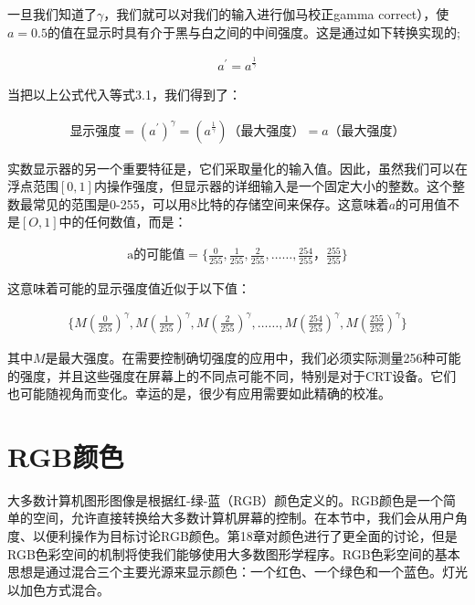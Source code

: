 \documentclass[lang=cn,12pt]{elegantbook}
\begin{document}
一旦我们知道了$\gamma$，我们就可以对我们的输入进行伽马校正gamma correct），使$a=0.5$的值在显示时具有介于黑与白之间的中间强度。这是通过如下转换实现的;

\[
  \begin{aligned}
  a^{'} = a^{\frac{1}{\gamma } }
  \end{aligned}
\]

当把以上公式代入等式3.1，我们得到了：

\[
  \begin{aligned}
  \mbox{显示强度} = (a^{'})^\gamma = (a^{\frac{1}{\gamma}})\mbox{（最大强度）} = a\mbox{（最大强度）}
  \end{aligned}
\]


实数显示器的另一个重要特征是，它们采取量化的输入值。因此，虽然我们可以在浮点范围$[0,1]$内操作强度，但显示器的详细输入是一个固定大小的整数。这个整数最常见的范围是0-255，可以用8比特的存储空间来保存。这意味着$a$的可用值不是$[O,1]$中的任何数值，而是：

\[
  \begin{aligned}
  \mbox{a的可能值} = \{\frac{0}{255},\frac{1}{255},\frac{2}{255},……,\frac{254}{255}，\frac{255}{255}\}
  \end{aligned}
\]

这意味着可能的显示强度值近似于以下值：

\[
  \begin{aligned}
  \{M(\frac{0}{255})^\gamma ,M(\frac{1}{255})^\gamma ,M(\frac{2}{255})^\gamma ,……,M(\frac{254}{255})^\gamma ,M(\frac{255}{255})^\gamma \}
  \end{aligned}
\]

其中$M$是最大强度。在需要控制确切强度的应用中，我们必须实际测量256种可能的强度，并且这些强度在屏幕上的不同点可能不同，特别是对于CRT设备。它们也可能随视角而变化。幸运的是，很少有应用需要如此精确的校准。

\section{RGB颜色}

大多数计算机图形图像是根据红-绿-蓝（RGB）颜色定义的。RGB颜色是一个简单的空间，允许直接转换给大多数计算机屏幕的控制。在本节中，我们会从用户角度、以便利操作为目标讨论RGB颜色。第18章对颜色进行了更全面的讨论，但是RGB色彩空间的机制将使我们能够使用大多数图形学程序。RGB色彩空间的基本思想是通过混合三个主要光源来显示颜色：一个红色、一个绿色和一个蓝色。灯光以加色方式混合。
\end{document}
